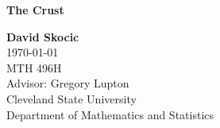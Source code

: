 \begin{titlepage}
	\begin{center}
		\vspace*{1pt}
		\vfill

		\Huge
		\textbf{The Crust}

		\vspace{0.5cm}
		\LARGE
		\vspace{1.5cm}

		\textbf{David Skocic} \\
		\Large
		\today\\
		MTH 496H \\
		Advisor: Gregory Lupton \\
		Cleveland State University \\
		Department of Mathematics and Statistics

		\vspace{1cm}
		\vfill
		

		\vfill
	\end{center}
\end{titlepage}

